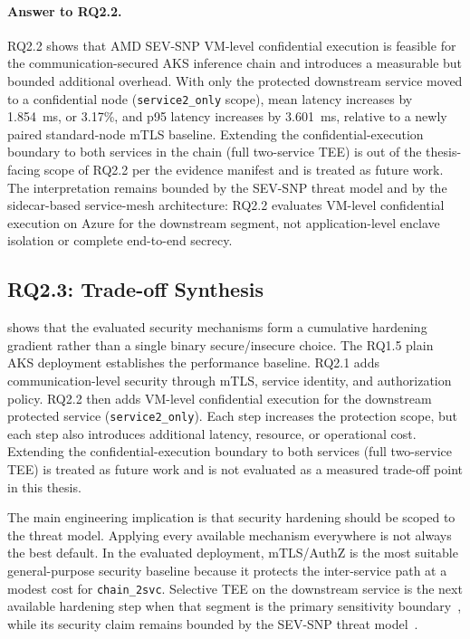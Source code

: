 \paragraph{Answer to RQ2.2.}
RQ2.2 shows that AMD SEV-SNP VM-level confidential execution is feasible for
the communication-secured AKS inference chain and introduces a measurable but
bounded additional overhead. With only the protected downstream service moved
to a confidential node (\texttt{service2\_only} scope), mean latency
increases by 1.854~ms, or 3.17\%, and p95 latency increases by 3.601~ms,
relative to a newly paired standard-node mTLS baseline. Extending the
confidential-execution boundary to both services in the chain (full
two-service TEE) is out of the thesis-facing scope of RQ2.2 per the evidence
manifest and is treated as future work. The interpretation remains bounded by
the SEV-SNP threat model and by the sidecar-based service-mesh architecture:
RQ2.2 evaluates VM-level confidential execution on Azure for the downstream
segment, not application-level enclave isolation or complete end-to-end
secrecy.

\subsection{RQ2.3: Trade-off Synthesis}
\label{sec:analysis-rq23}

 shows that the evaluated security mechanisms form a
cumulative hardening gradient rather than a single binary secure/insecure
choice. The RQ1.5 plain AKS deployment establishes the performance baseline.
RQ2.1 adds communication-level security through mTLS, service identity, and
authorization policy. RQ2.2 then adds VM-level confidential execution for the
downstream protected service (\texttt{service2\_only}). Each step increases
the protection scope, but each step also introduces additional latency,
resource, or operational cost. Extending the confidential-execution boundary
to both services (full two-service TEE) is treated as future work and is not
evaluated as a measured trade-off point in this thesis.

The main engineering implication is that security hardening should be scoped
to the threat model. Applying every available mechanism everywhere is not
always the best default. In the evaluated deployment, mTLS/AuthZ is the most
suitable general-purpose security baseline because it protects the
inter-service path at a modest cost for \texttt{chain\_2svc}. Selective TEE
on the downstream service is the next available hardening step when that
segment is the primary sensitivity
boundary~\cite{he2021_attacking_collaborative}, while its security claim
remains bounded by the SEV-SNP threat
model~\cite{schluter2024_heckler}.

